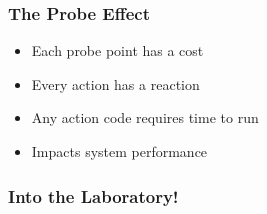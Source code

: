 \documentclass[pdftex]{beamer} %
\begin{document}
\begin{frame}
  \frametitle{The Probe Effect}
  \begin{itemize}
  \item Each probe point has a cost
  \item Every action has a reaction
  \item Any action code requires time to run
  \item Impacts system performance
  \end{itemize}
\end{frame}

\begin{frame}
  \frametitle{Into the Laboratory!}
\end{frame}
\end{document}
